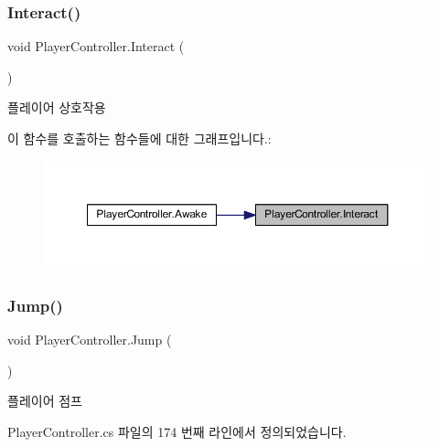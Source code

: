 \subsubsection{\texorpdfstring{Interact()}{Interact()}}
{\footnotesize\ttfamily void Player\+Controller.\+Interact (\begin{DoxyParamCaption}{ }\end{DoxyParamCaption})}



플레이어 상호작용 

이 함수를 호출하는 함수들에 대한 그래프입니다.\+:
\nopagebreak
\begin{figure}[H]
\begin{center}
\leavevmode
\includegraphics[width=350pt]{dc/dde/class_player_controller_a1f27776786e67be2633f94b97c93ebdc_icgraph}
\end{center}
\end{figure}
\mbox{\label{class_player_controller_a8a7010cb6f3c524737be3f6f77553df9}} 
\subsubsection{\texorpdfstring{Jump()}{Jump()}}
{\footnotesize\ttfamily void Player\+Controller.\+Jump (\begin{DoxyParamCaption}{ }\end{DoxyParamCaption})}



플레이어 점프 



Player\+Controller.\+cs 파일의 174 번째 라인에서 정의되었습니다.


